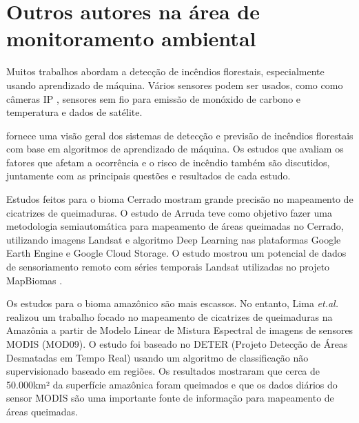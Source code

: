 


\section{Outros autores na área de monitoramento ambiental}


Muitos trabalhos abordam a detecção de incêndios florestais, especialmente usando aprendizado de máquina. Vários sensores podem ser usados, como
como câmeras IP \cite{forest-fire-ip-camera}, sensores sem fio para emissão de monóxido de carbono e temperatura \cite{forest-fire-detection-wireless-sensor} e dados de satélite.

\cite{Abid2021} fornece uma visão geral dos sistemas de detecção e previsão de incêndios florestais com base em algoritmos de aprendizado de máquina.
Os estudos que avaliam os fatores que afetam a ocorrência e o risco de incêndio também são discutidos, juntamente com as principais questões e resultados de cada estudo.

Estudos feitos para o bioma Cerrado mostram grande precisão no mapeamento de cicatrizes de queimaduras. O estudo de Arruda \cite{queimadas_cerrado}  teve como objetivo fazer uma metodologia semiautomática para mapeamento de áreas queimadas no Cerrado, utilizando imagens Landsat e algoritmo Deep Learning nas plataformas Google Earth Engine e Google Cloud Storage. O estudo mostrou um potencial de dados de sensoriamento remoto com séries temporais Landsat utilizadas no projeto MapBiomas \cite{MapBiomasQueimadas}.





Os estudos para o bioma amazônico são mais escassos. No entanto, Lima \textit{et.al.} \cite{ModisGiovanna} realizou um trabalho focado no mapeamento de cicatrizes de queimaduras na Amazônia a partir de Modelo Linear de Mistura Espectral de imagens de sensores MODIS (MOD09). O estudo foi baseado no DETER (Projeto Detecção de Áreas Desmatadas em Tempo Real) \cite{deter} usando um algoritmo de classificação não supervisionado baseado em regiões. Os resultados mostraram que cerca de 50.000km² da superfície amazônica foram queimados e que os dados diários do sensor MODIS são uma importante fonte de informação para mapeamento de áreas queimadas.


